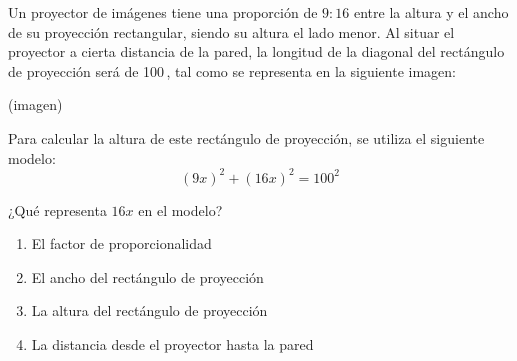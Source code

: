 \begin{problem}
    Un proyector de imágenes tiene una proporción de $9 : 16$ entre la altura y el ancho de su proyección rectangular, siendo su altura el lado menor. Al situar el proyector a cierta distancia de la pared, la longitud de la diagonal del rectángulo de proyección será de 100\,, tal como se representa en la siguiente imagen:

    \begin{center}
    (imagen)
    \end{center}

    Para calcular la altura de este rectángulo de proyección, se utiliza el siguiente modelo:
    \[
    (9x)^2 + (16x)^2 = 100^2
    \]

    ¿Qué representa $16x$ en el modelo?

    \begin{enumerate}[label=\Alph*.]
        \item El factor de proporcionalidad
        \item El ancho del rectángulo de proyección
        \item La altura del rectángulo de proyección
        \item La distancia desde el proyector hasta la pared
    \end{enumerate}
\end{problem}
